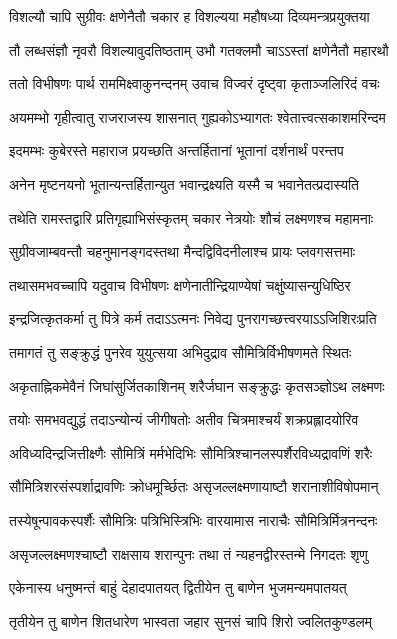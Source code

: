 \twolineshloka
{विशल्यौ चापि सुग्रीवः क्षणेनैतौ चकार ह}
{विशल्यया महौषध्या दिव्यमन्त्रप्रयुक्तया}


\twolineshloka
{तौ लब्धसंज्ञौ नृवरौ विशल्यावुदतिष्ठताम्}
{उभौ गतक्लमौ चाऽऽस्तां क्षणेनैतौ महारथौ}


\twolineshloka
{ततो विभीषणः पार्थ राममिक्ष्वाकुनन्दनम्}
{उवाच विज्वरं दृष्ट्वा कृताञ्जलिरिदं वचः}


\twolineshloka
{अयमम्भो गृहीत्वातु राजराजस्य शासनात्}
{गुह्यकोऽभ्यागतः श्वेतात्त्वत्सकाशमरिन्दम}


\twolineshloka
{इदमम्भः कुबेरस्ते महाराज प्रयच्छति}
{अन्तर्हितानां भूतानां दर्शनार्थं परन्तप}


\twolineshloka
{अनेन मृष्टनयनो भूतान्यन्तर्हितान्युत}
{भवान्द्रक्ष्यति यस्मै च भवानेतत्प्रदास्यति}


\twolineshloka
{तथेति रामस्तद्वारि प्रतिगृह्याभिसंस्कृतम्}
{चकार नेत्रयोः शौचं लक्ष्मणश्च महामनाः}


\twolineshloka
{सुग्रीवजाम्बवन्तौ चहनुमानङ्गदस्तथा}
{मैन्दद्विविदनीलाश्च प्रायः प्लवगसत्तमाः}


\twolineshloka
{तथासमभवच्चापि यदुवाच विभीषणः}
{क्षणेनातीन्द्रियाण्येषां चक्षुंष्यासन्युधिष्ठिर}


\twolineshloka
{इन्द्रजित्कृतकर्मा तु पित्रे कर्म तदाऽऽत्मनः}
{निवेद्य पुनरागच्छत्त्वरयाऽऽजिशिरःप्रति}


\twolineshloka
{तमागतं तु सङ्क्रुद्धं पुनरेव युयुत्सया}
{अभिदुद्राव सौमित्रिर्विभीषणमते स्थितः}


\twolineshloka
{अकृताह्निकमेवैनं जिघांसुर्जितकाशिनम्}
{शरैर्जघान सङ्क्रुद्धः कृतसञ्ज्ञोऽथ लक्ष्मणः}


\twolineshloka
{तयोः समभवद्युद्धं तदाऽन्योन्यं जीगीषतोः}
{अतीव चित्रमाश्चर्यं शक्रप्रह्लादयोरिव}


\twolineshloka
{अविध्यदिन्द्रजित्तीक्ष्णैः सौमित्रिं मर्मभेदिभिः}
{सौमित्रिश्चानलस्पर्शैरविध्यद्रावणिं शरैः}


\twolineshloka
{सौमित्रिशरसंस्पर्शाद्रावणिः क्रोधमूर्च्छितः}
{असृजल्लक्ष्मणायाष्टौ शरानाशीविषोपमान्}


\twolineshloka
{तस्येषून्पावकस्पर्शैः सौमित्रिः पत्रिभिस्त्रिभिः}
{वारयामास नाराचैः सौमित्रिर्मित्रनन्दनः}


\twolineshloka
{असृजल्लक्ष्मणश्चाष्टौ राक्षसाय शरान्पुनः}
{तथा तं न्यहनद्वीरस्तन्मे निगदतः शृणु}


\twolineshloka
{एकेनास्य धनुष्मन्तं बाहुं देहादपातयत्}
{द्वितीयेन तु बाणेन भुजमन्यमपातयत्}


\twolineshloka
{तृतीयेन तु बाणेन शितधारेण भास्वता}
{जहार सुनसं चापि शिरो ज्वलितकुण्डलम्}


